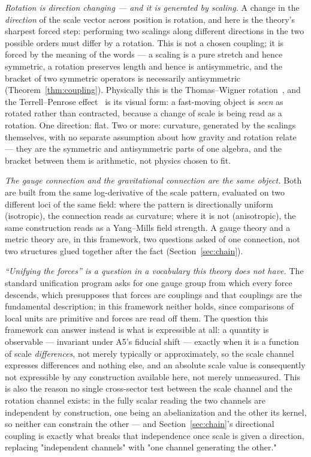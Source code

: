 \documentclass[pdflatex,sn-mathphys-num]{sn-jnl}
\theoremstyle{thmstyleone}
\theoremstyle{thmstylethree}
\theoremstyle{thmstyletwo}
\begin{document}
\emph{Rotation is direction changing — and it is \emph{generated} by
scaling.} A change in the \emph{direction} of the scale vector across
position is rotation, and here is the theory's sharpest forced step:
performing two scalings along different directions in the two possible
orders must differ by a rotation. This is not a chosen coupling; it is
forced by the meaning of the words — a scaling is a pure stretch and
hence symmetric, a rotation preserves length and hence is antisymmetric,
and the bracket of two symmetric operators is necessarily antisymmetric
(Theorem~\ref{thm:coupling}). Physically this is the Thomas–Wigner
rotation~\cite{Thomas1926}, and the
Terrell–Penrose effect~\cite{Terrell1959,Penrose1959} is its visual form: a
fast-moving object is \emph{seen} as rotated rather than contracted,
because a change of scale is being read as a rotation. One direction:
flat. Two or more: curvature, generated by the scalings themselves, with
no separate assumption about how gravity and rotation relate — they are
the symmetric and antisymmetric parts of one algebra, and the bracket
between them is arithmetic, not physics chosen to fit.

\emph{The gauge connection and the gravitational connection are the same
object.} Both are built from the same log-derivative of the scale
pattern, evaluated on two different loci of the same field: where the
pattern is directionally uniform (isotropic), the connection reads as
curvature; where it is not (anisotropic), the same construction reads as
a Yang–Mills field strength. A gauge theory and a metric theory are, in
this framework, two questions asked of one connection, not two
structures glued together after the fact (Section~\ref{sec:chain}).

\emph{``Unifying the forces'' is a question in a vocabulary this theory
does not have.} The standard unification program asks for one gauge
group from which every force descends, which presupposes that forces
are couplings and that couplings are the fundamental description; in
this framework neither holds, since comparisons of local units are
primitive and forces are read off them. The question this framework can
answer instead is what is expressible at all: a quantity is observable —
invariant under A5's fiducial shift — exactly when it is a function of
scale \emph{differences}, not merely typically or approximately, so the
scale channel expresses differences and nothing else, and an absolute
scale value is consequently not expressible by any construction
available here, not merely unmeasured. This is also the reason no
single cross-sector test between the scale channel and the rotation
channel exists: in the fully scalar reading the two channels are
independent by construction, one being an abelianization and the other
its kernel, so neither can constrain the other — and Section~\ref{sec:chain}'s
directional coupling is exactly what breaks that independence once
scale is given a direction, replacing "independent channels" with "one
channel generating the other."
\end{document}
